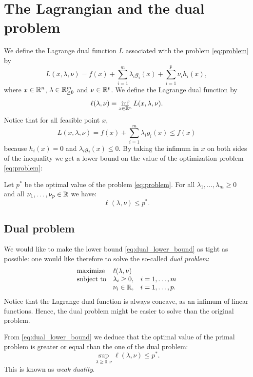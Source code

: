 \documentclass[11pt,nocut]{article}
\begin{document}
\section{The Lagrangian and the dual problem}

We define the Lagrange dual function $L$ associated with the problem \eqref{eq:problem} by
\begin{equation}
	L(x,\lambda,\nu) = 
	f(x) + \sum_{i=1}^m \lambda_i g_i(x) + \sum_{i=1}^p \nu_i h_i(x),
\end{equation}
where $x \in \mathbb{R}^n$, $\lambda \in \mathbb{R}_{\geq 0}^m$ and $\nu \in \mathbb{R}^p$. We define the Lagrange dual function by
$$
\ell(\lambda,\nu) = \inf_{x \in \mathbb{R}^n} L(x,\lambda,\nu).
$$
Notice that for all feasible point $x$,
$$
L(x,\lambda,\nu)
= f(x) + \sum_{i=1}^m \lambda_i g_i(x) \leq f(x)
$$
because $h_i(x) = 0$ and $\lambda_i g_i(x) \leq 0$. By taking the infimum in $x$ on both sides of the inequality we get a lower bound on the value of the optimization problem \eqref{eq:problem}:
\begin{proposition}
	Let $p^*$ be the optimal value of the problem \eqref{eq:problem}.
	For all $\lambda_1, \dots, \lambda_m \geq 0$ and all $\nu_1, \dots,\nu_p \in \mathbb{R}$ we have:
	\begin{equation}\label{eq:dual_lower_bound}
		\ell(\lambda,\nu) \leq p^*.
	\end{equation}
\end{proposition}

\subsection{Dual problem}

We would like to make the lower bound \eqref{eq:dual_lower_bound} as tight as possible: one would like therefore to solve the so-called \emph{dual problem}:
\begin{equation}\label{eq:dual_problem}
	\begin{array}{lll}
		\text{maximize} & \ell(\lambda,\nu) & \\
		\text{subject to} & \lambda_i \geq 0, & i=1, \dots, m \\
						  & \nu_i \in \mathbb{R}, & i=1, \dots, p.
	\end{array}
\end{equation}
Notice that the Lagrange dual function is always concave, as an infimum of linear functions. Hence, the dual problem might be easier to solve than the original problem.

From \eqref{eq:dual_lower_bound} we deduce that the optimal value of the primal problem is greater or equal than the one of the dual problem:
\begin{equation}\label{eq:weak_duality}
	\sup_{\lambda \geq 0, \nu} \ell(\lambda,\nu) \leq p^*.
\end{equation}
This is known as \emph{weak duality}.
\\
\end{document}

